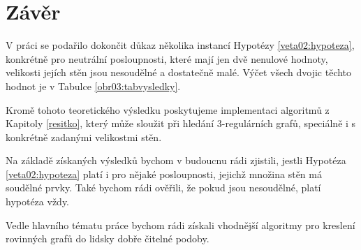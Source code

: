 \chapter*{Závěr}
V práci se podařilo dokončit důkaz několika instancí Hypotézy \ref{veta02:hypoteza}, konkrétně pro neutrální posloupnosti, které mají jen dvě nenulové hodnoty, velikosti jejích stěn jsou nesoudělné a dostatečně malé. Výčet všech dvojic těchto hodnot je v Tabulce \ref{obr03:tabvysledky}.

Kromě tohoto teoretického výsledku poskytujeme implementaci algoritmů z Kapitoly \ref{resitko}, který může sloužit při hledání 3-regulárních grafů, speciálně i s konkrétně zadanými velikostmi stěn.

Na základě získaných výsledků bychom v budoucnu rádi zjistili, jestli Hypotéza \ref{veta02:hypoteza} platí i pro nějaké posloupnosti, jejichž množina stěn má soudělné prvky. Také bychom rádi ověřili, že pokud jsou nesoudělné, platí hypotéza vždy.

Vedle hlavního tématu práce bychom rádi získali vhodnější algoritmy pro kreslení rovinných grafů do lidsky dobře čitelné podoby.